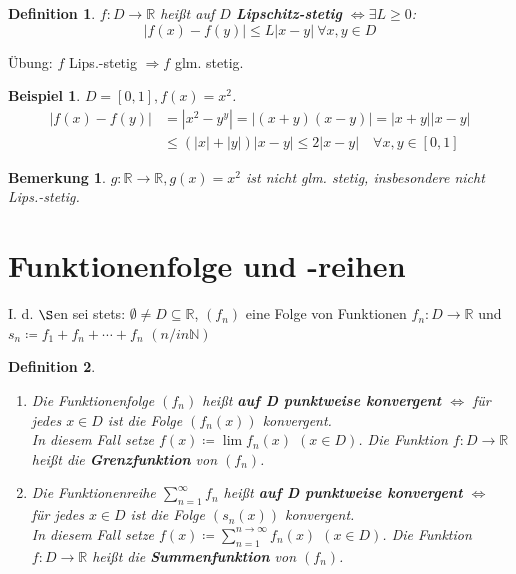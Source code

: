 \documentclass[14pt,titlepage,ngerman,a4paper,headsepline,DIV15,halfparskip*]{scrartcl}
\newcommand{\N}{\mathbb{N}}
\newcommand{\R}{\mathbb{R}}
\theoremstyle{named}
\theoremstyle{dotless}
\newtheorem*{beispiel*}{Beispiel}
\newtheorem*{bemerkung}{Bemerkung}
\newtheorem*{definition}{Definition}
\begin{document}
\begin{definition}
	$f \colon D \rightarrow \R$ hei{\ss}t auf $D$ \textbf{Lipschitz-stetig} $\iff \exists L \geq 0$:
	$$ | f(x) - f(y) | \leq L |x - y| ~\forall x, y \in D  $$
\end{definition}

Übung: $f$ Lips.-stetig $\Rightarrow f$ glm. stetig.


\begin{beispiel*}
	$D = [0, 1], f(x) = x^{2}$.
	\begin{align*}
		|f(x) - f(y) | & = |x^{2} - y^{y}| = |(x + y) (x - y)| = |x+y| |x-y| \\
			& \leq (|x| + |y|) |x - y| \leq 2 |x - y| \quad \forall x, y \in [0, 1]
	\end{align*}
\end{beispiel*}


\begin{bemerkung}
	$g \colon \R \rightarrow \R, g(x) = x^{2}$ ist nicht glm. stetig, insbesondere nicht Lips.-stetig.	
\end{bemerkung}

\newpage

\section{Funktionenfolge und -reihen}
I. d. $\S$en sei stets: $\emptyset \neq D \subseteq \R$, $(f_{n})$ eine Folge von Funktionen $f_{n} \colon D \rightarrow \R$ und $s_{n} \coloneqq f_{1} + f_{n} + \cdots + f_{n}$ $(n /in \N)$

  
\begin{definition} ~\
 	\begin{enumerate}
		\item Die Funktionenfolge $(f_{n})$ hei{\ss}t \textbf{auf D punktweise konvergent} $\iff$ für jedes $x \in D$ ist die Folge $(f_{n}(x))$ konvergent. \\
			In diesem Fall setze $f(x) \coloneqq \lim f_{n}(x)$ $(x \in D)$. Die Funktion $f \colon D \rightarrow \R$ hei{\ss}t die \textbf{Grenzfunktion} von $(f_{n})$.
		\item Die Funktionenreihe $\sum_{n=1}^{\infty} f_{n}$ hei{\ss}t  \textbf{auf D punktweise konvergent} $\iff$ für jedes $x \in D$ ist die Folge $(s_{n}(x))$ konvergent. \\
			In diesem Fall setze $f(x) \coloneqq \sum_{n=1}^{n\rightarrow\infty} f_{n}(x)$ $(x \in D)$. Die Funktion $f \colon D \rightarrow \R$ hei{\ss}t die \textbf{Summenfunktion} von $(f_{n})$.
	\end{enumerate}
\end{definition}
\end{document}
